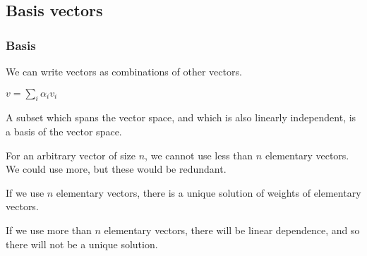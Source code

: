 
\subsection{Basis vectors}

\subsubsection{Basis}

We can write vectors as combinations of other vectors.

\(v=\sum_i \alpha_i v_i\)

A subset which spans the vector space, and which is also linearly independent, is a basis of the vector space.

For an arbitrary vector of size \(n\), we cannot use less than \(n\) elementary vectors. We could use more, but these would be redundant.

If we use \(n\) elementary vectors, there is a unique solution of weights of elementary vectors.

If we use more than \(n\) elementary vectors, there will be linear dependence, and so there will not be a unique solution.

